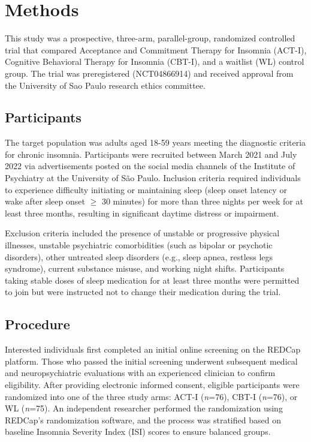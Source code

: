 \documentclass[
  english,
  man]{apa6}
\begin{document}
\section{Methods}\label{methods}

This study was a prospective, three-arm, parallel-group, randomized controlled trial that compared Acceptance and Commitment Therapy for Insomnia (ACT-I), Cognitive Behavioral Therapy for Insomnia (CBT-I), and a waitlist (WL) control group. The trial was preregistered (NCT04866914) and received approval from the University of Sao Paulo research ethics committee.

\subsection{Participants}\label{participants}

The target population was adults aged 18-59 years meeting the diagnostic criteria for chronic insomnia. Participants were recruited between March 2021 and July 2022 via advertisements posted on the social media channels of the Institute of Psychiatry at the University of São Paulo. Inclusion criteria required individuals to experience difficulty initiating or maintaining sleep (sleep onset latency or wake after sleep onset \(\geq\) 30 minutes) for more than three nights per week for at least three months, resulting in significant daytime distress or impairment.

Exclusion criteria included the presence of unstable or progressive physical illnesses, unstable psychiatric comorbidities (such as bipolar or psychotic disorders), other untreated sleep disorders (e.g., sleep apnea, restless legs syndrome), current substance misuse, and working night shifts. Participants taking stable doses of sleep medication for at least three months were permitted to join but were instructed not to change their medication during the trial.

\subsection{Procedure}\label{procedure}

Interested individuals first completed an initial online screening on the REDCap platform. Those who passed the initial screening underwent subsequent medical and neuropsychiatric evaluations with an experienced clinician to confirm eligibility. After providing electronic informed consent, eligible participants were randomized into one of the three study arms: ACT-I (\emph{n}=76), CBT-I (\emph{n}=76), or WL (\emph{n}=75). An independent researcher performed the randomization using REDCap's randomization software, and the process was stratified based on baseline Insomnia Severity Index (ISI) scores to ensure balanced groups.
\end{document}
